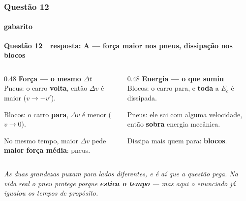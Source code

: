 \documentclass[aspectratio=169,12pt]{beamer}
\newcommand{\resposta}[2]{%
  \par\vspace{0.2em}
  {\Large\bfseries\color{vinho}Quest\~ao #1 \,\textemdash\, resposta: #2}
  \par\vspace{0.6em}}
\begin{document}
\begin{frame}
\frametitle{Quest\~ao 12}
\framesubtitle{gabarito}
\resposta{12}{A --- for\c{c}a maior nos pneus, dissipa\c{c}\~ao nos blocos}

\linespread{0.92}\selectfont
\begin{columns}[T]
\begin{column}{0.48\textwidth}
\textbf{For\c{c}a --- o mesmo $\Delta t$}\\
Pneus: o carro \textbf{volta}, ent\~ao $\Delta v$ \'e maior
($v \to -v'$).

\vspace{0.2em}
Blocos: o carro \textbf{para}, $\Delta v$ \'e menor ($v \to 0$).

\vspace{0.2em}
No mesmo tempo, maior $\Delta v$ pede \textbf{maior for\c{c}a
m\'edia}: pneus.
\end{column}
\begin{column}{0.48\textwidth}
\textbf{Energia --- o que sumiu}\\
Blocos: o carro para, e \textbf{toda} a $E_c$ \'e dissipada.

\vspace{0.2em}
Pneus: ele sai com alguma velocidade, ent\~ao \textbf{sobra} energia
mec\^anica.

\vspace{0.2em}
Dissipa mais quem para: \textbf{blocos}.
\end{column}
\end{columns}

\vspace{0.4em}
{\color{grafite}\itshape\small As duas grandezas puxam para lados
diferentes, e \'e a\'i que a quest\~ao pega. Na vida real o pneu
protege porque \textbf{estica o tempo} --- mas aqui o enunciado j\'a
igualou os tempos de prop\'osito.}
\end{frame}
\end{document}
